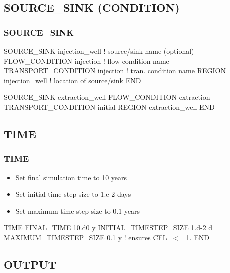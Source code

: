 \documentclass{beamer}
\newcommand\bluecomment[1]{{{\color{blue} #1}}}
\begin{document}
\subsection{SOURCE\_SINK (CONDITION)}

\begin{frame}\frametitle{\bf SOURCE\_SINK}

\begin{semiverbatim}
SOURCE_SINK injection_well   \bluecomment{! source/sink name (optional)}
  FLOW_CONDITION injection       \bluecomment{! flow condition name}
  TRANSPORT_CONDITION injection  \bluecomment{! tran. condition name}
  REGION injection_well        \bluecomment{! location of source/sink}
END

SOURCE_SINK extraction_well
  FLOW_CONDITION extraction
  TRANSPORT_CONDITION initial
  REGION extraction_well
END
\end{semiverbatim}

\end{frame}

\subsection{TIME}

\begin{frame}[fragile]\frametitle{\bf TIME}

\begin{itemize}
\item Set final simulation time to 10 years
\item Set initial time step size to 1.e-2 days
\item Set maximum time step size to 0.1 years
\end{itemize}


\begin{semiverbatim}

TIME
  FINAL_TIME 10.d0 y
  INITIAL_TIMESTEP_SIZE 1.d-2 d
  MAXIMUM_TIMESTEP_SIZE 0.1 y    \bluecomment{! ensures CFL ~<= 1.}
END
\end{semiverbatim}

\end{frame}

\subsection{OUTPUT}
\end{document}
